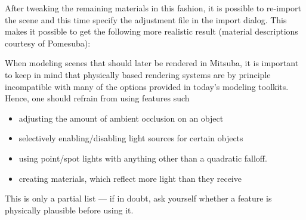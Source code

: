 After tweaking the remaining materials in this fashion, it is possible to re-import the scene and this time specify the adjustment file in the import dialog.
This makes it possible to get the following more realistic result (material descriptions courtesy of Pomesuba):
\begin{center}
\end{center}
When modeling scenes that should later be rendered in Mitsuba, it is
important to keep in mind that physically based rendering systems are by
principle incompatible with many of the options provided in today's 
modeling toolkits. Hence, one should refrain from using features such 
\begin{itemize}
\item adjusting the amount of ambient occlusion on an object 
\item selectively enabling/disabling light sources for certain
objects
\item using point/spot lights with anything other than a quadratic falloff.
\item creating materials, which reflect more light than they receive
\end{itemize}
This is only a partial list --- if in doubt, ask yourself whether a feature
is physically plausible before using it.
